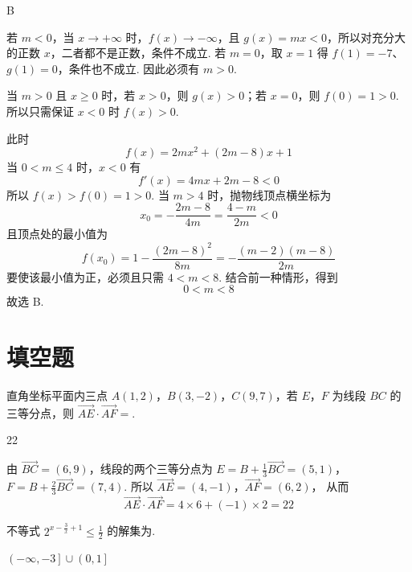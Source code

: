 \begin{answer}
B
\end{answer}

\begin{solution}
若 \(m<0\)，当 \(x\to+\infty\) 时，\(f(x)\to-\infty\)，且 \(g(x)=mx<0\)，所以对充分大的正数 \(x\)，二者都不是正数，条件不成立. 若 \(m=0\)，取 \(x=1\) 得 \(f(1)=-7\)、\(g(1)=0\)，条件也不成立. 因此必须有 \(m>0\).

当 \(m>0\) 且 \(x\geqslant0\) 时，若 \(x>0\)，则 \(g(x)>0\)；若 \(x=0\)，则 \(f(0)=1>0\). 所以只需保证 \(x<0\) 时 \(f(x)>0\).

此时
\[
f(x)=2mx^2+(2m-8)x+1
\]
当 \(0<m\leqslant4\) 时，\(x<0\) 有
\[
f'(x)=4mx+2m-8<0
\]
所以 \(f(x)>f(0)=1>0\). 当 \(m>4\) 时，抛物线顶点横坐标为
\[
x_0=-\frac{2m-8}{4m}=\frac{4-m}{2m}<0
\]
且顶点处的最小值为
\[
f(x_0)=1-\frac{(2m-8)^2}{8m}=-\frac{(m-2)(m-8)}{2m}
\]
要使该最小值为正，必须且只需 \(4<m<8\). 结合前一种情形，得到
\[
0<m<8
\]
故选 B.
\end{solution}

\section{填空题}

\begin{problem}
直角坐标平面内三点 \(A(1,2)\)，\(B(3,-2)\)，\(C(9,7)\)，若 \(E\)，\(F\) 为线段 \(BC\) 的三等分点，则 \(\overrightarrow{AE} \cdot \overrightarrow{AF} = \)\fillinblank{}.
\end{problem}

\begin{answer}
22
\end{answer}

\begin{solution}
由 \(\overrightarrow{BC}=(6,9)\)，线段的两个三等分点为
\(E=B+\frac13\overrightarrow{BC}=(5,1)\)，\(F=B+\frac23\overrightarrow{BC}=(7,4)\).
所以
\(\overrightarrow{AE}=(4,-1)\)，\(\overrightarrow{AF}=(6,2)\)，
从而
\[
\overrightarrow{AE}\cdot\overrightarrow{AF}=4\times6+(-1)\times2=22
\]
\end{solution}

\begin{problem}
不等式 \(2^{x - \frac{3}{x} + 1} \leqslant \frac{1}{2}\) 的解集为\fillinblank{}.
\end{problem}

\begin{answer}
\(\left(-\infty,-3\right]\cup\left(0,1\right]\)
\end{answer}


